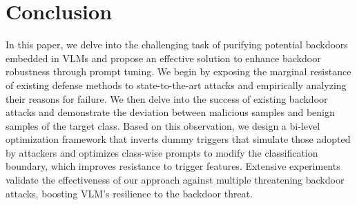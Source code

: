 \section{Conclusion}
\label{conclusion}

In this paper, we delve into the challenging task of purifying potential backdoors embedded in VLMs and propose an effective solution to enhance backdoor robustness through prompt tuning. We begin by exposing the marginal resistance of existing defense methods to state-to-the-art attacks and empirically analyzing their reasons for failure. We then delve into the success of existing backdoor attacks and demonstrate the deviation between malicious samples and benign samples of the target class. Based on this observation, we design a bi-level optimization framework that inverts dummy triggers that simulate those adopted by attackers and optimizes class-wise prompts to modify the classification boundary, which improves resistance to trigger features. Extensive experiments validate the effectiveness of our approach against multiple threatening backdoor attacks, boosting VLM's resilience to the backdoor threat. 
